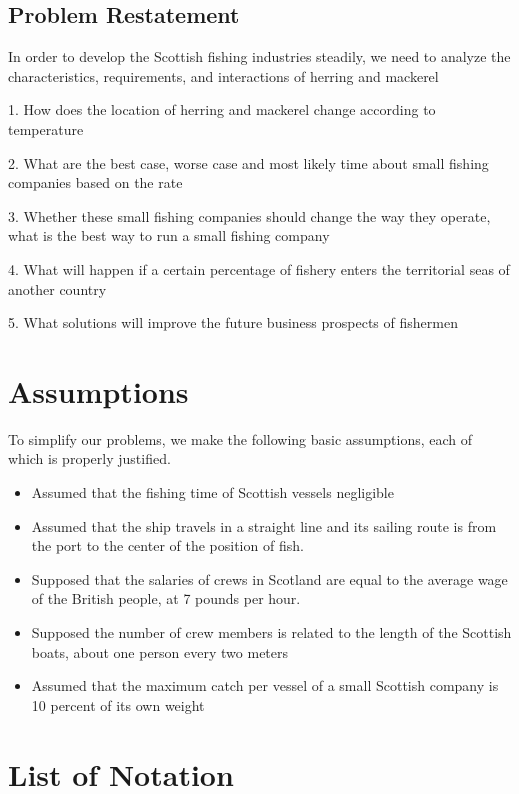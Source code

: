\documentclass{mcmthesis}
\begin{document}
\subsection{Problem Restatement}
In order to develop the Scottish fishing industries steadily,   we need to analyze the characteristics, requirements, and interactions of herring and mackerel

1.    How does the location of herring and mackerel change according to temperature

2.    What are the best case, worse case and most likely time about  small fishing companies  based on the rate 


3.    Whether these small fishing companies should change the way they operate, what is the best way to run a small fishing company
 
4.    What will happen if a certain percentage of fishery enters the territorial seas of another country

5.    What solutions will improve the future business prospects of fishermen

\section{Assumptions}
To simplify our problems, we make the following basic assumptions, each of which is properly justified.

\begin{itemize}

\item 
Assumed that the fishing time of Scottish vessels negligible

\item 
Assumed that the ship travels in a straight line and its sailing route is from the port to the center of the position of fish.
\item 
Supposed that the salaries of crews in Scotland are equal to the average wage of the British people, at 7 pounds per hour.
\item 
Supposed the number of crew members is related to the length of the Scottish boats, about one person every two meters
\item 
Assumed that the maximum catch per vessel of a small Scottish company is 10 percent of its own weight

\end{itemize}

\section{List of Notation}
\end{document}
